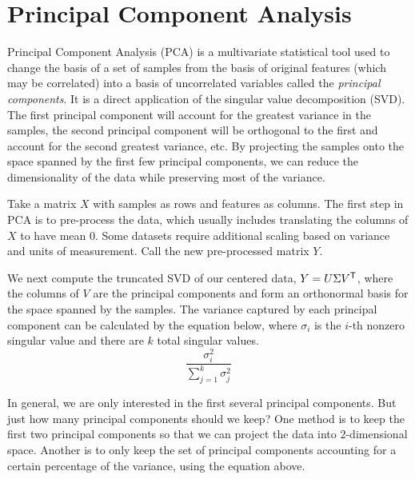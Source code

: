 \label{lab:pca} 

\section*{Principal Component Analysis} %

Principal Component Analysis (PCA) is a multivariate statistical tool used to change the basis of a set of samples from the basis of original features (which may be correlated) into a basis of uncorrelated variables called the \emph{principal components}.
It is a direct application of the singular value decomposition (SVD).
The first principal component will account for the greatest variance in the samples, the second principal component will be orthogonal to the first and account for the second greatest variance, etc.
By projecting the samples onto the space spanned by the first few principal components, we can reduce the dimensionality of the data while preserving most of the variance.

Take a matrix $X$ with samples as rows and features as columns.
The first step in PCA is to pre-process the data, which usually includes translating the columns of $X$ to have mean 0.
Some datasets require additional scaling based on variance and units of measurement.
Call the new pre-processed matrix $Y$.

We next compute the truncated SVD of our centered data, $Y = U\Sigma V^{\mathsf T} $, where the columns of $V$ are the principal components and form an orthonormal basis for the space spanned by the samples.
The variance captured by each principal component can be calculated by the equation below, where $\sigma_{i}$ is the $i$-th nonzero singular value and there are $k$ total singular values.
\begin{equation}
\frac{\sigma^2_{i}}{\sum_{j=1}^{k} \sigma^2_{j}}
\label{equation:pc}
\end{equation}

In general, we are only interested in the first several principal components.
But just how many principal components should we keep?
One method is to keep the first two principal components so that we can project the data into $2$-dimensional space.
Another is to only keep the set of principal components accounting for a certain percentage of the variance, using the equation above.


